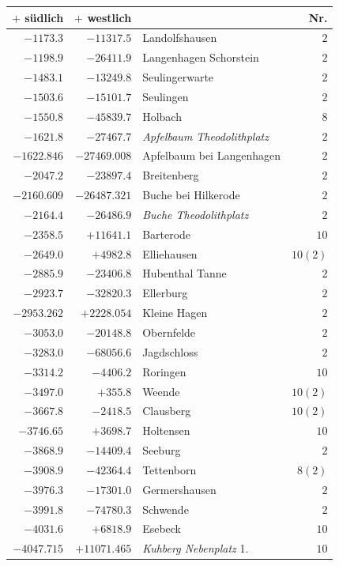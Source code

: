 \clearpage{}%
\begin{center}\begingroup\fontsize{8}{9}\selectfont
\setlength{\tabcolsep}{4pt}
\begin{tabular}{r|r|p{170pt}|r}\hline
\(+\) südlich&\(+\) westlich&&Nr.\\\hline
\(-1173.3\)&\(-11317.5\)&Landolfshausen&\(2\)\\
\(-1198.9\)&\(-26411.9\)&Langenhagen Schorstein&\(2\)\\
\(-1483.1\)&\(-13249.8\)&Seulingerwarte&\(2\)\\
\(-1503.6\)&\(-15101.7\)&Seulingen&\(2\)\\
\(-1550.8\)&\(-45839.7\)&Holbach&\(8\)\\
\(-1621.8\)&\(-27467.7\)&\textit{Apfelbaum Theodolithplatz}&\(2\)\\
\(-1622.846\)&\(-27469.008\)&Apfelbaum bei Langenhagen&\(2\)\\
\(-2047.2\)&\(-23897.4\)&Breitenberg&\(2\)\\
\(-2160.609\)&\(-26487.321\)&Buche bei Hilkerode&\(2\)\\
\(-2164.4\)&\(-26486.9\)&\textit{Buche Theodolithplatz}&\(2\)\\
\(-2358.5\)&\(+11641.1\)&Barterode&\(10\)\\
\(-2649.0\)&\(+4982.8\)&Elliehausen&\(10 (2)\)\\
\(-2885.9\)&\(-23406.8\)&Hubenthal Tanne&\(2\)\\
\(-2923.7\)&\(-32820.3\)&Ellerburg&\(2\)\\
\(-2953.262\)&\(+2228.054\)&Kleine Hagen&\(2\)\\
\(-3053.0\)&\(-20148.8\)&Obernfelde&\(2\)\\
\(-3283.0\)&\(-68056.6\)&Jagdschloss&\(2\)\\
\(-3314.2\)&\(-4406.2\)&Roringen&\(10\)\\
\(-3497.0\)&\(+355.8\)&Weende&\(10 (2)\)\\
\(-3667.8\)&\(-2418.5\)&Clausberg&\(10 (2)\)\\
\(-3746.65\)&\(+3698.7\)&Holtensen&\(10\)\\
\(-3868.9\)&\(-14409.4\)&Seeburg&\(2\)\\
\(-3908.9\)&\(-42364.4\)&Tettenborn&\(8 (2)\)\\
\(-3976.3\)&\(-17301.0\)&Germershausen&\(2\)\\
\(-3991.8\)&\(-74780.3\)&Schwende&\(2\)\\
\(-4031.6\)&\(+6818.9\)&Esebeck&\(10\)\\
\(-4047.715\)&\(+11071.465\)&\textit{Kuhberg Nebenplatz} 1.&\(10\)\\

\end{tabular}
\end{center}
